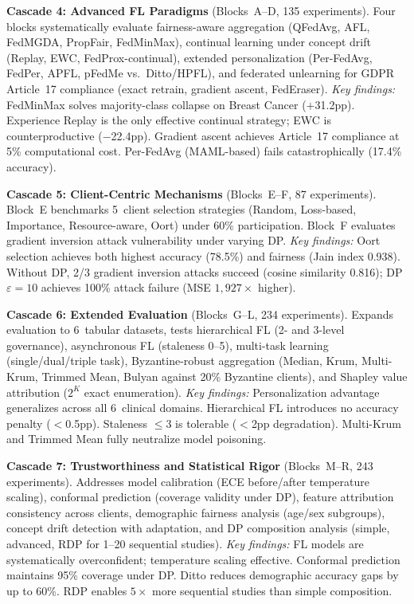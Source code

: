 \documentclass[conference]{IEEEtran}
\begin{document}
\smallskip\noindent\textbf{Cascade 4: Advanced FL Paradigms} (Blocks~A--D, 135 experiments). Four blocks systematically evaluate fairness-aware aggregation (QFedAvg, AFL, FedMGDA, PropFair, FedMinMax), continual learning under concept drift (Replay, EWC, FedProx-continual), extended personalization (Per-FedAvg, FedPer, APFL, pFedMe vs.\ Ditto/HPFL), and federated unlearning for GDPR Article~17 compliance (exact retrain, gradient ascent, FedEraser). \textit{Key findings:} FedMinMax solves majority-class collapse on Breast Cancer ($+$31.2pp). Experience Replay is the only effective continual strategy; EWC is counterproductive ($-$22.4pp). Gradient ascent achieves Article~17 compliance at 5\% computational cost. Per-FedAvg (MAML-based) fails catastrophically (17.4\% accuracy).

\smallskip\noindent\textbf{Cascade 5: Client-Centric Mechanisms} (Blocks~E--F, 87 experiments). Block~E benchmarks 5~client selection strategies (Random, Loss-based, Importance, Resource-aware, Oort) under 60\% participation. Block~F evaluates gradient inversion attack vulnerability under varying DP. \textit{Key findings:} Oort selection achieves both highest accuracy (78.5\%) and fairness (Jain index 0.938). Without DP, 2/3 gradient inversion attacks succeed (cosine similarity 0.816); DP $\varepsilon{=}10$ achieves 100\% attack failure (MSE $1{,}927\times$ higher).

\smallskip\noindent\textbf{Cascade 6: Extended Evaluation} (Blocks~G--L, 234 experiments). Expands evaluation to 6~tabular datasets, tests hierarchical FL (2- and 3-level governance), asynchronous FL (staleness 0--5), multi-task learning (single/dual/triple task), Byzantine-robust aggregation (Median, Krum, Multi-Krum, Trimmed Mean, Bulyan against 20\% Byzantine clients), and Shapley value attribution ($2^K$ exact enumeration). \textit{Key findings:} Personalization advantage generalizes across all 6~clinical domains. Hierarchical FL introduces no accuracy penalty ($<$0.5pp). Staleness $\leq$3 is tolerable ($<$2pp degradation). Multi-Krum and Trimmed Mean fully neutralize model poisoning.

\smallskip\noindent\textbf{Cascade 7: Trustworthiness and Statistical Rigor} (Blocks~M--R, 243 experiments). Addresses model calibration (ECE before/after temperature scaling), conformal prediction (coverage validity under DP), feature attribution consistency across clients, demographic fairness analysis (age/sex subgroups), concept drift detection with adaptation, and DP composition analysis (simple, advanced, RDP for 1--20 sequential studies). \textit{Key findings:} FL models are systematically overconfident; temperature scaling effective. Conformal prediction maintains 95\% coverage under DP. Ditto reduces demographic accuracy gaps by up to 60\%. RDP enables $5\times$ more sequential studies than simple composition.
\end{document}

